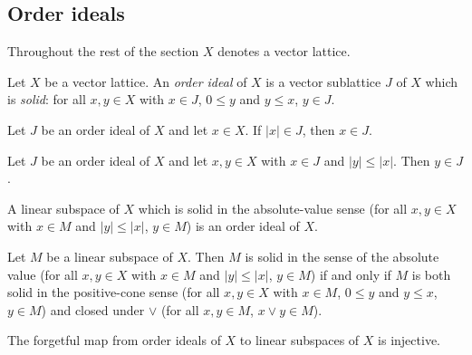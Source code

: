 \subsection{Order ideals}

Throughout the rest of the section $X$ denotes a vector lattice.

\begin{definition}
\label{def:order-ideal}
\leanok
{}
Let $X$ be a vector lattice. An \emph{order ideal} of $X$ is a vector
sublattice $J$ of $X$ which is \emph{solid}: for all $x, y \in X$
with $x \in J$, $0 \le y$ and $y \le x$, $y \in J$.
\end{definition}

\begin{lemma}
\label{lem:orderIdeal-mem-of-abs-mem}
\leanok
{}
Let $J$ be an order ideal of $X$ and let $x \in X$. If
$\lvert x \rvert \in J$, then $x \in J$.
\end{lemma}

\begin{lemma}
\label{lem:orderIdeal-mem-of-abs-le-abs}
\leanok
{}
Let $J$ be an order ideal of $X$ and let $x, y \in X$ with $x \in J$
and $\lvert y \rvert \le \lvert x \rvert$. Then $y \in J$.
\end{lemma}

\begin{lemma}
\label{lem:orderIdeal-ofSolid}
\leanok
{}
A linear subspace of $X$ which is solid in the absolute-value sense
(for all $x, y \in X$ with $x \in M$ and $\lvert y \rvert \le
\lvert x \rvert$, $y \in M$) is an order ideal of $X$.
\end{lemma}

\begin{lemma}
\label{lem:orderIdeal-solid-iff}
\leanok
{}
Let $M$ be a linear subspace of $X$. Then $M$ is solid in the sense
of the absolute value (for all $x, y \in X$ with $x \in M$ and
$\lvert y \rvert \le \lvert x \rvert$, $y \in M$) if and only if $M$
is both solid in the positive-cone sense (for all $x, y \in X$ with
$x \in M$, $0 \le y$ and $y \le x$, $y \in M$) and closed under
$\vee$ (for all $x, y \in M$, $x \vee y \in M$).
\end{lemma}

\begin{lemma}
\label{lem:orderIdeal-toSubmodule-injective}
\leanok
{}
The forgetful map from order ideals of $X$ to linear subspaces of
$X$ is injective.
\end{lemma}

